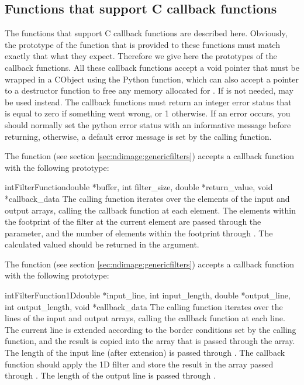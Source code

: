 \subsection{Functions that support C callback functions}
The  functions that support C callback functions are 
described here. Obviously, the prototype of the function that is provided 
to these functions must match exactly that what they expect. Therefore we 
give here the prototypes of the callback functions. All these callback 
functions accept a void  pointer that must be wrapped in 
a CObject using the Python  
function, which can also accept a pointer to a destructor function to free 
any memory allocated for . If  is not 
needed,  may be used instead. The callback 
functions must return an integer error status that is equal to zero if 
something went wrong, or 1 otherwise. If an error occurs, you should 
normally set the python error status with an informative message before 
returning, otherwise, a default error message is set by the calling 
function.

The function  (see section 
\ref{sec:ndimage:genericfilters}) accepts a callback function with the 
following prototype:
\begin{cfuncdesc}{int}{FilterFunction}{double *buffer, int filter_size,
double *return_value, void *callback_data} The calling function iterates 
over the elements of the input and output arrays, calling the callback 
function at each element. The elements within the footprint of the filter 
at the current element are passed through the  parameter, and 
the number of elements within the footprint through . The 
calculated valued should be returned in the  argument.
\end{cfuncdesc}

The function  (see section 
\ref{sec:ndimage:genericfilters}) accepts a callback function with the 
following prototype: 
\begin{cfuncdesc}{int}{FilterFunction1D}{double *input_line, int 
input_length, double *output_line, int output_length, void *callback_data} 
The calling function iterates over the lines of the input and output 
arrays, calling the callback function at each line. The current line is 
extended according to the border conditions set by the calling function, 
and the result is copied into the array that is passed through the 
 array. The length of the input line (after extension) is 
passed through . The callback function should apply the 
1D filter and store the result in the array passed through 
. The length of the output line is passed through 
.
\end{cfuncdesc}

